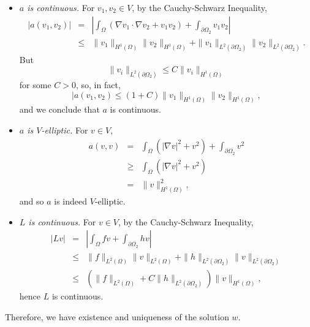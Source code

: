 \documentclass{article}
\begin{document}
\begin{enumerate}
\begin{enumerate}
\begin{itemize}
\item {\em \(a\) is continuous.}  For \(v_1,v_2 \in V\), by the Cauchy-Schwarz Inequality,
\begin{eqnarray*}
|a(v_1,v_2)| &   =  & \left| \int_{\Omega} \left( \nabla v_1 \cdot \nabla v_2 + v_1 v_2 \right) + \int_{\partial\Omega_2} v_1 v_2 \right| \\
             & \leq & \|v_1\|_{H^1(\Omega)} \|v_2\|_{H^1(\Omega)} + \|v_1\|_{L^2(\partial\Omega_2)} \|v_2\|_{L^2(\partial\Omega_2)}.
\end{eqnarray*}
But
\[\|v_i\|_{L^2(\partial\Omega_2)} \leq C \|v_i\|_{H^1(\Omega)}\]
for some \(C > 0\), so, in fact,
\[|a(v_1,v_2) \leq (1 + C) \|v_1\|_{H^1(\Omega)} \|v_2\|_{H^1(\Omega)},\]
and we conclude that \(a\) is continuous.

\item {\em \(a\) is \(V\)-elliptic.}  For \(v \in V\),
\begin{eqnarray*}
a(v,v) &   =  & \int_{\Omega} \left( |\nabla v|^2 + v^2 \right) + \int_{\partial\Omega_2} v^2 \\
       & \geq & \int_{\Omega} \left( |\nabla v|^2 + v^2 \right) \\
       &   =  & \|v\|_{H^1(\Omega)}^2,
\end{eqnarray*}
and so \(a\) is indeed \(V\)-elliptic.

\item {\em \(L\) is continuous.}  For \(v \in V\), by the Cauchy-Schwarz Inequality,
\begin{eqnarray*}
|Lv| &   =  & \left| \int_{\Omega} fv + \int_{\partial\Omega_2} hv \right| \\
     & \leq & \|f\|_{L^2(\Omega)} \|v\|_{L^2(\Omega)} + \|h\|_{L^2(\partial\Omega_2)} \|v\|_{L^2(\partial\Omega_2)} \\
     & \leq & \left( \|f\|_{L^2(\Omega)} + C \|h\|_{L^2(\partial\Omega_2)} \right) \|v\|_{H^1(\Omega)},
\end{eqnarray*}
hence \(L\) is continuous.

\end{itemize}

Therefore, we have existence and uniqueness of the solution \(w\).


\end{enumerate}
\end{enumerate}
\end{document}
